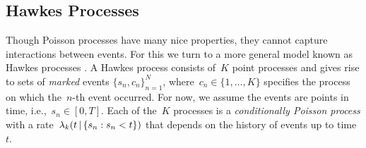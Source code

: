 \subsection{Hawkes Processes}
Though Poisson processes have many nice properties, they cannot capture interactions between events. For this we turn to a more general model known as Hawkes processes \cite{Hawkes-1971}. A Hawkes process consists of~$K$ point processes and gives rise to sets of \emph{marked} events $\{s_n,c_n\}_{n=1}^N$, where~${c_n\in\{1,\ldots,K\}}$ specifies the process on which the~$n$-th event occurred. For now, we assume the events are points in time, i.e.,~${s_n\in[0,T]}$. 
Each of the~$K$ processes is a \emph{conditionally Poisson process} with a rate~${\lambda_k(t\,|\, \{s_n:s_n<t\})}$ that depends on the history of events up to time~$t$.

